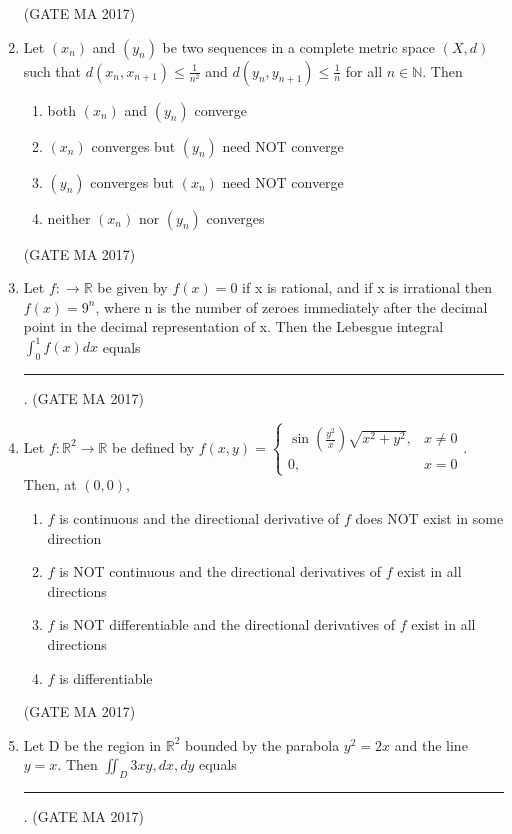 \documentclass[journal,12pt,onecolumn]{IEEEtran}
\theoremstyle{remark}
\begin{document}
\begin{enumerate}
\begin{enumerate}
\end{enumerate}
\hfill (GATE MA 2017)
\item
Let $(x_n)$ and $(y_n)$ be two sequences in a complete metric space $(X,d)$ such that $d(x_n, x_{n+1}) \le \frac{1}{n^2}$ and $d(y_n, y_{n+1}) \le \frac{1}{n}$ for all $n \in \mathbb{N}$. Then
\begin{enumerate}
\item both $(x_n)$ and $(y_n)$ converge
\item $(x_n)$ converges but $(y_n)$ need NOT converge
\item $(y_n)$ converges but $(x_n)$ need NOT converge
\item neither $(x_n)$ nor $(y_n)$ converges
\end{enumerate}
\hfill (GATE MA 2017)
\item
Let $f: \to \mathbb{R}$ be given by $f(x)=0$ if x is rational, and if x is irrational then $f(x)=9^n$, where n is the number of zeroes immediately after the decimal point in the decimal representation of x. Then the Lebesgue integral $\int_0^1 f(x) dx$ equals \rule{1.5cm}{0.4pt}.
\hfill (GATE MA 2017)
\item
Let $f: \mathbb{R}^2 \to \mathbb{R}$ be defined by $f(x,y) =
\begin{cases}
\sin(\frac{y^2}{x}) \sqrt{x^2+y^2}, & x \neq 0 \\
0, & x=0
\end{cases}$.
Then, at $(0,0)$,
\begin{enumerate}
\item $f$ is continuous and the directional derivative of $f$ does NOT exist in some direction
\item $f$ is NOT continuous and the directional derivatives of $f$ exist in all directions
\item $f$ is NOT differentiable and the directional derivatives of $f$ exist in all directions
\item $f$ is differentiable
\end{enumerate}
\hfill (GATE MA 2017)
\item
Let D be the region in $\mathbb{R}^2$ bounded by the parabola $y^2=2x$ and the line $y=x$. Then $\iint_D 3xy ,dx,dy$ equals \rule{1.5cm}{0.4pt}.
\hfill (GATE MA 2017)

\end{enumerate}
\end{document}
